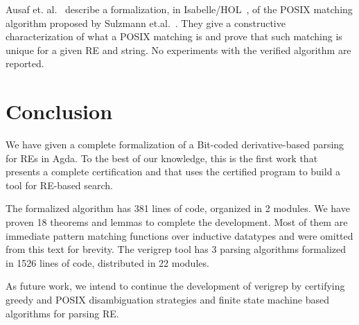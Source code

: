 \documentclass[sigplan, anonymous, review]{acmart}
\theoremstyle{definition}
\begin{document}
Ausaf et. al.~\cite{AusafDU16} describe a formalization, in
Isabelle/HOL~\cite{Nipkow02}, of the POSIX matching algorithm proposed
by Sulzmann et.al.~\cite{SulzmannL14}. They give a constructive
characterization of what a POSIX matching is and prove that such
matching is unique for a given RE and string. No experiments with the
verified algorithm are reported.


\section{Conclusion}\label{sec:conclusion}

We have given a complete formalization of a Bit-coded derivative-based 
parsing for REs in Agda. To the best of our knowledge, this is the first work
that presents a complete certification and that uses the certified
program to build a tool for RE-based search.

The formalized algorithm has 381 lines of code, organized in 2
modules. We have proven 18 theorems and lemmas to complete the
development. Most of them are immediate pattern matching functions
over inductive datatypes and were omitted from this text for brevity.
The verigrep tool has 3 parsing algorithms formalized in 1526 lines of code, 
distributed in 22 modules.

As future work, we intend to continue the development of verigrep by
certifying greedy and POSIX disambiguation strategies and finite state machine
based algorithms for parsing RE.



\end{document}
